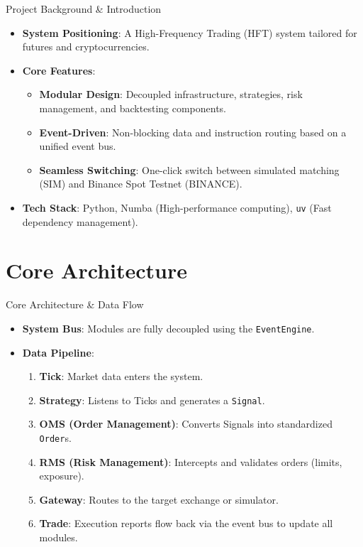 \documentclass{beamer}
\begin{document}
\begin{frame}{Project Background \& Introduction}
    \begin{itemize}
        \item \textbf{System Positioning}: A High-Frequency Trading (HFT) system tailored for futures and cryptocurrencies.
        \item \textbf{Core Features}:
        \begin{itemize}
            \item \textbf{Modular Design}: Decoupled infrastructure, strategies, risk management, and backtesting components.
            \item \textbf{Event-Driven}: Non-blocking data and instruction routing based on a unified event bus.
            \item \textbf{Seamless Switching}: One-click switch between simulated matching (SIM) and Binance Spot Testnet (BINANCE).
        \end{itemize}
        \item \textbf{Tech Stack}: Python, Numba (High-performance computing), \texttt{uv} (Fast dependency management).
    \end{itemize}
\end{frame}

\section{Core Architecture}

\begin{frame}{Core Architecture \& Data Flow}
    \begin{itemize}
        \item \textbf{System Bus}: Modules are fully decoupled using the \texttt{EventEngine}.
        \item \textbf{Data Pipeline}:
        \begin{enumerate}
            \item \textbf{Tick}: Market data enters the system.
            \item \textbf{Strategy}: Listens to Ticks and generates a \texttt{Signal}.
            \item \textbf{OMS (Order Management)}: Converts Signals into standardized \texttt{Order}s.
            \item \textbf{RMS (Risk Management)}: Intercepts and validates orders (limits, exposure).
            \item \textbf{Gateway}: Routes to the target exchange or simulator.
            \item \textbf{Trade}: Execution reports flow back via the event bus to update all modules.
        \end{enumerate}
    \end{itemize}
\end{frame}
\end{document}
